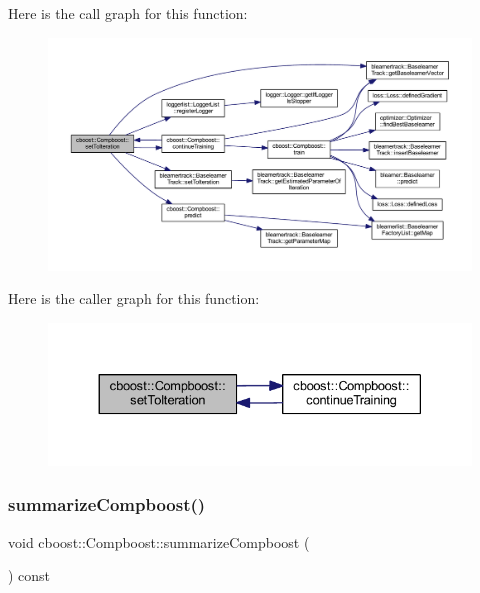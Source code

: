 Here is the call graph for this function\+:
\nopagebreak
\begin{figure}[H]
\begin{center}
\leavevmode
\includegraphics[width=350pt]{classcboost_1_1_compboost_ad1ee3b88f585f38255d827dceb4b7659_cgraph}
\end{center}
\end{figure}
Here is the caller graph for this function\+:
\nopagebreak
\begin{figure}[H]
\begin{center}
\leavevmode
\includegraphics[width=330pt]{classcboost_1_1_compboost_ad1ee3b88f585f38255d827dceb4b7659_icgraph}
\end{center}
\end{figure}
\mbox{\label{classcboost_1_1_compboost_a7be8cb767054ece895d535c1f468233e}} 
\subsubsection{\texorpdfstring{summarize\+Compboost()}{summarizeCompboost()}}
{\footnotesize\ttfamily void cboost\+::\+Compboost\+::summarize\+Compboost (\begin{DoxyParamCaption}{ }\end{DoxyParamCaption}) const}

